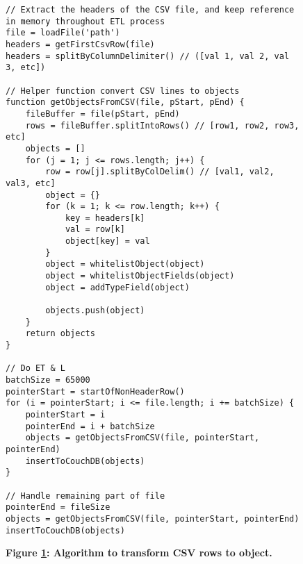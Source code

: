 \begin{figure}[H]
  \centering
  \begin{mdframed}
    \centering
    \begin{verbatim}
// Extract the headers of the CSV file, and keep reference in memory throughout ETL process
file = loadFile('path')
headers = getFirstCsvRow(file)
headers = splitByColumnDelimiter() // ([val 1, val 2, val 3, etc])

// Helper function convert CSV lines to objects
function getObjectsFromCSV(file, pStart, pEnd) {
    fileBuffer = file(pStart, pEnd)
    rows = fileBuffer.splitIntoRows() // [row1, row2, row3, etc]
    objects = []
    for (j = 1; j <= rows.length; j++) {
        row = row[j].splitByColDelim() // [val1, val2, val3, etc]
        object = {}
        for (k = 1; k <= row.length; k++) {
            key = headers[k]
            val = row[k]
            object[key] = val
        }
        object = whitelistObject(object)
        object = whitelistObjectFields(object)
        object = addTypeField(object)

        objects.push(object)
    }
    return objects
}

// Do ET & L
batchSize = 65000
pointerStart = startOfNonHeaderRow()
for (i = pointerStart; i <= file.length; i += batchSize) {
    pointerStart = i
    pointerEnd = i + batchSize
    objects = getObjectsFromCSV(file, pointerStart, pointerEnd)
    insertToCouchDB(objects)
}

// Handle remaining part of file
pointerEnd = fileSize
objects = getObjectsFromCSV(file, pointerStart, pointerEnd)
insertToCouchDB(objects)
        \end{verbatim}
  \end{mdframed}
  \caption[Row to object transformation]{\textbf{Figure \ref{row-object-transformation}: Algorithm to transform CSV rows to object.}}
  \label{row-object-transformation}
\end{figure}